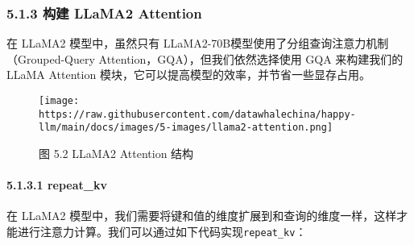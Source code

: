 \documentclass[12pt,a4paper]{book}
\begin{document}
\subsubsection{5.1.3 构建 LLaMA2
Attention}\label{ux6784ux5efa-llama2-attention}

在 LLaMA2 模型中，虽然只有
LLaMA2-70B模型使用了分组查询注意力机制（Grouped-Query
Attention，GQA），但我们依然选择使用 GQA 来构建我们的 LLaMA Attention
模块，它可以提高模型的效率，并节省一些显存占用。

\begin{figure}[htbp]\centering
\texttt{[image: https://raw.githubusercontent.com/datawhalechina/happy-llm/main/docs/images/5-images/llama2-attention.png]}
\caption{图 5.2 LLaMA2 Attention 结构}
\end{figure}

\paragraph{5.1.3.1 repeat\_kv}\label{repeat_kv}

在 LLaMA2
模型中，我们需要将键和值的维度扩展到和查询的维度一样，这样才能进行注意力计算。我们可以通过如下代码实现\texttt{repeat\_kv}：

\begin{Shaded}
\begin{Highlighting}[]
\NormalTok{) }\OperatorTok{{-}\textgreater{}}
\OperatorTok{=}
    
    \OperatorTok{==} \NormalTok{:}
    
    \NormalTok{ (}
\NormalTok{        x[:, :, :, }\NormalTok{, :]  }
\OperatorTok{*}
\NormalTok{    )}
\end{Highlighting}
\end{Shaded}
\end{document}
